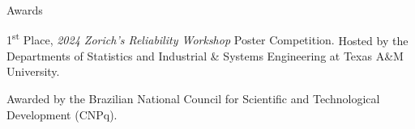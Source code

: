 \begin{cvcontentsection}{Awards}

\cvaward
    {1\textsuperscript{st} Place, \textit{2024 Zorich's Reliability Workshop} Poster Competition.}
    {Hosted by the Departments of Statistics and Industrial \& Systems Engineering at Texas A\&M University.}

    {Awarded by the Brazilian National Council for Scientific and Technological Development (CNPq).}

\end{cvcontentsection}
